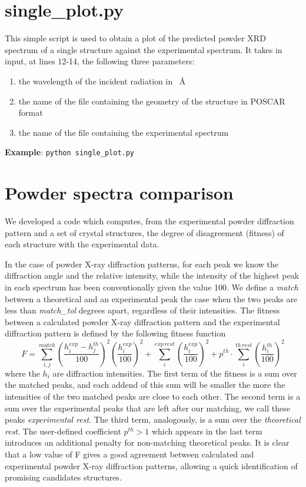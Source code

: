 \documentclass{article}
\begin{document}
\section{single\_plot.py}
This simple script is used to obtain a plot of the predicted powder XRD spectrum of a single structure against the experimental spectrum. It takes in input, at lines 12-14, the following three parameters:
\begin{enumerate}
	\item the wavelength of the incident radiation in \SI{}{\angstrom}
	\item the name of the file containing the geometry of the structure in POSCAR format
	\item the name of the file containing the experimental spectrum
\end{enumerate}
\textbf{Example}: \texttt{python single\_plot.py}

\newpage
\appendix
\appendixpage

\section{Powder spectra comparison}
\label{sec:powderspectracomp}

We developed a code which computes, from the experimental powder diffraction pattern and a set of crystal structures, the degree of disagreement (fitness) of each structure with the experimental data.

In the case of powder X-ray diffraction patterns, for each peak we know the diffraction angle and the relative intensity, while the intensity of the highest peak in each spectrum has been conventionally given the value 100. We define a \emph{match} between a theoretical and an experimental peak the case when the two peaks are less than \emph{match\_tol} degrees apart, regardless of their intensities. The fitness between a calculated powder X-ray diffraction pattern and the experimental diffraction pattern is defined by the following fitness function
\begin{equation*}
	F = \sum_{i, j}^{match} \left( \frac{h_i^{exp} - h_j^{th}}{100} \right)^2 \left( \frac{h_i^{exp}}{100} \right)^2 + \sum_i^{exp \, rest} \left( \frac{h_i^{exp}}{100} \right)^2 + p^{th} \cdot \sum_i^{th \, rest} \left( \frac{h_i^{th}}{100} \right)^2
\end{equation*}
where the $h_i$ are diffraction intensities. The first term of the fitness is a sum over the matched peaks, and each addend of this sum will be smaller the more the intensities of the two matched peaks are close to each other. The second term is a sum over the experimental peaks that are left after our matching, we call these peaks \emph{experimental rest}. The third term, analogously, is a sum over the \emph{theoretical rest}. The user-defined coefficient $p^{th} > 1$ which appears in the last term introduces an additional penalty for non-matching theoretical peaks. It is clear that a low value of F gives a good agreement between calculated and experimental powder X-ray diffraction patterns, allowing a quick identification of promising candidates structures.
\end{document}

